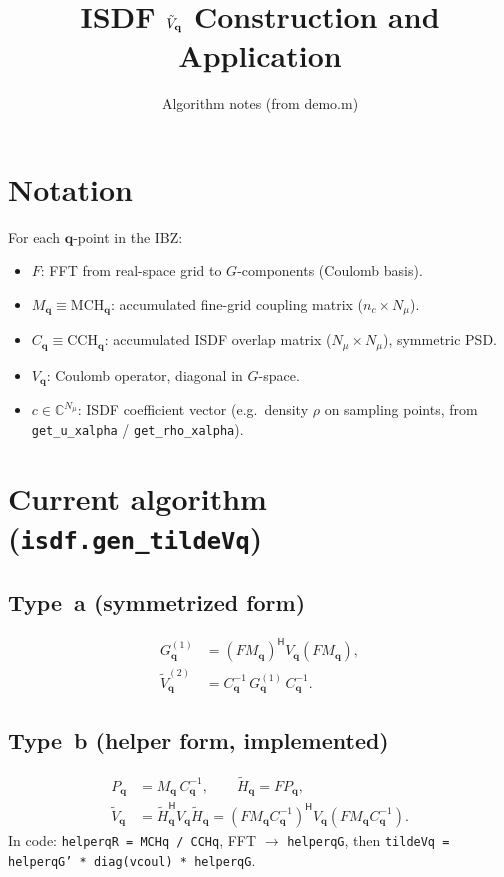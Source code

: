 \documentclass[11pt]{article}
\title{ISDF $\tilde{V}_{\qq}$ Construction and Application}
\author{Algorithm notes (from demo.m)}
\date{}
\newcommand{\qq}{\mathbf{q}}
\begin{document}
\maketitle

\section{Notation}
For each $\qq$-point in the IBZ:
\begin{itemize}
  \item $F$: FFT from real-space grid to $G$-components (Coulomb basis).
  \item $M_{\qq} \equiv \mathrm{MCH}_{\qq}$: accumulated fine-grid coupling matrix ($n_c \times N_\mu$).
  \item $C_{\qq} \equiv \mathrm{CCH}_{\qq}$: accumulated ISDF overlap matrix ($N_\mu \times N_\mu$), symmetric PSD.
  \item $V_{\qq}$: Coulomb operator, diagonal in $G$-space.
  \item $c \in \mathbb{C}^{N_\mu}$: ISDF coefficient vector (e.g.\ density $\rho$ on sampling points, from \texttt{get\_u\_xalpha} / \texttt{get\_rho\_xalpha}).
\end{itemize}

\section{Current algorithm (\texttt{isdf.gen\_tildeVq})}

\subsection{Type~a (symmetrized form)}
\begin{align}
  G_{\qq}^{(1)} &= (F M_{\qq})^{\mathsf{H}} V_{\qq} (F M_{\qq}), \\
  \tilde{V}_{\qq}^{(2)} &= C_{\qq}^{-1}\, G_{\qq}^{(1)}\, C_{\qq}^{-1}.
\end{align}

\subsection{Type~b (helper form, implemented)}
\begin{align}
  P_{\qq} &= M_{\qq}\, C_{\qq}^{-1}, \qquad
  \tilde{H}_{\qq} = F P_{\qq}, \\
  \tilde{V}_{\qq} &= \tilde{H}_{\qq}^{\mathsf{H}} V_{\qq} \tilde{H}_{\qq}
  = (F M_{\qq} C_{\qq}^{-1})^{\mathsf{H}} V_{\qq} (F M_{\qq} C_{\qq}^{-1}).
\end{align}
In code: \texttt{helperqR = MCHq / CCHq}, FFT $\to$ \texttt{helperqG}, then
\texttt{tildeVq = helperqG' * diag(vcoul) * helperqG}.
\end{document}
